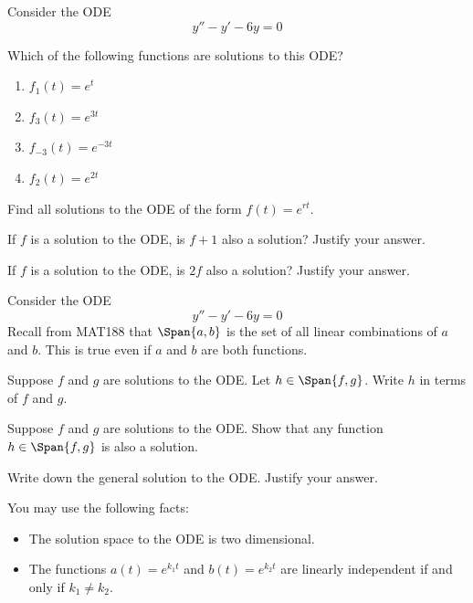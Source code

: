 \documentclass{workbook}
\begin{document}
\begin{slide}
	\question
	Consider the ODE
	\[
		y''-y'-6y=0
	\]
	\begin{parts}
		\item Which of the following functions are solutions to this ODE?
		\begin{enumerate}
			\item $f_1(t)=e^t$
			\item $f_3(t)=e^{3t}$
			\item $f_{-3}(t)=e^{-3t}$
			\item $f_{2}(t)=e^{2t}$
		\end{enumerate}
		\item Find all solutions to the ODE of the form $f(t)=e^{rt}$.
		\item If $f$ is a solution to the ODE, is $f+1$ also a solution? Justify your answer.
		\item If $f$ is a solution to the ODE, is $2f$ also a solution? Justify your answer.
	\end{parts}
\end{slide}


\begin{slide}
	\question
	Consider the ODE
	\[
		y''-y'-6y=0
	\]
	Recall from MAT188 that $\Span\{a,b\}$ is the set of all linear combinations of $a$ and $b$. This is true even if $a$ and $b$ are both 
	functions.

	\begin{parts}
		\item Suppose $f$ and $g$ are solutions to the ODE. 
		Let $h\in\Span\{f,g\}$. Write $h$ in terms of $f$ and $g$.
		\item Suppose $f$ and $g$ are solutions to the ODE. Show that
		any function $h\in \Span\{f,g\}$ is also a solution.

		\item Write down the general solution to the ODE. Justify your answer.

		You may use the following facts:
		\begin{itemize}
			\item The solution space to the ODE is two dimensional.
			\item The functions $a(t)=e^{k_1t}$ and $b(t)=e^{k_2t}$
			are linearly independent if and only if $k_1\neq k_2$.
		\end{itemize}
	\end{parts}
\end{slide}
\end{document}
